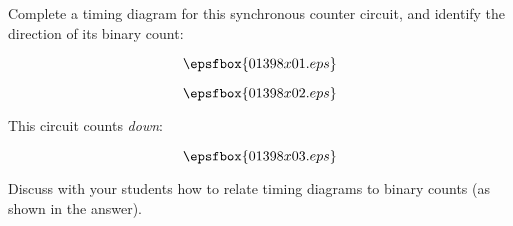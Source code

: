 

Complete a timing diagram for this synchronous counter circuit, and identify the direction of its binary count:

$$\epsfbox{01398x01.eps}$$

$$\epsfbox{01398x02.eps}$$







This circuit counts {\it down}:

$$\epsfbox{01398x03.eps}$$







Discuss with your students how to relate timing diagrams to binary counts (as shown in the answer).




